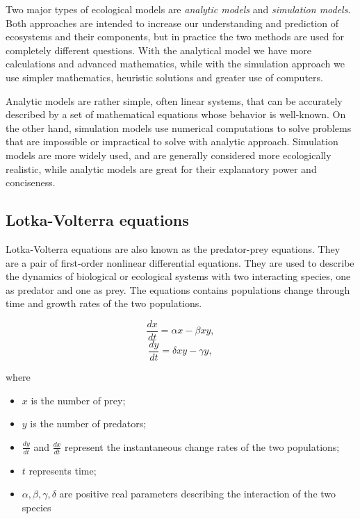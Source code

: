 Two major types of ecological models are \emph{analytic models} and \emph{simulation models}. Both approaches are intended to  increase our understanding and prediction of ecosystems and their components, but in practice the two methods are used for completely different questions. With the analytical model we have more calculations and advanced mathematics, while with the simulation approach we use simpler mathematics, heuristic solutions and greater use of computers.

Analytic models are rather simple, often linear systems, that can be accurately described by a set of mathematical equations whose behavior is well-known. On the other hand, simulation models use numerical computations to solve problems that are impossible or impractical to solve with analytic approach. Simulation models are more widely used, and are generally considered more ecologically realistic, while analytic models are great for their explanatory power and conciseness.

\subsection{Lotka-Volterra equations}
Lotka-Volterra equations are also known as the predator-prey equations. They are a pair of first-order nonlinear differential equations. They are used to describe the dynamics of biological or ecological systems with two interacting species, one as predator and one as prey. The equations contains populations change through time and growth rates of the two populations.

\begin{equation}
    \frac{dx}{dt} = \alpha x - \beta xy,
\end{equation}
\begin{equation}
    \frac{dy}{dt} = \delta xy - \gamma y,
\end{equation}

where
\begin{itemize}
    \item $x$ is the number of prey;
    \item $y$ is the number of predators;
    \item $\frac{dy}{dt}$ and $\frac{dx}{dt}$ represent the instantaneous change rates of the two populations;
    \item $t$ represents time;
    \item $\alpha, \beta, \gamma, \delta$ are positive real parameters describing the interaction of the two species
\end{itemize}

